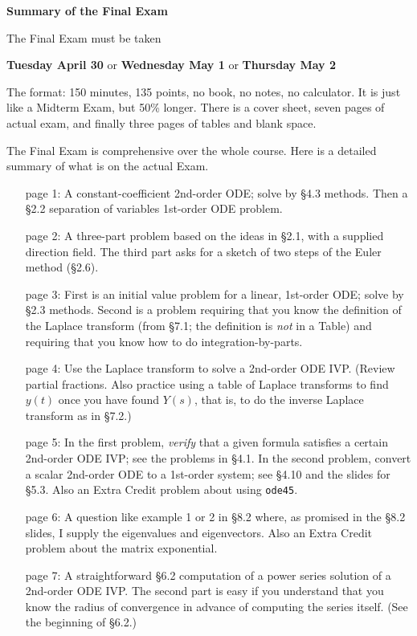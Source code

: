 \documentclass[12pt]{article}
\begin{document}
\phantom{k}
\vspace{2mm}
\Large\centerline{\textbf{Summary of the Final Exam}} \normalsize

\bigskip
The Final Exam must be taken

\medskip
\centerline{\textbf{Tuesday April 30} \quad or \quad \textbf{Wednesday May 1} \quad or \quad \textbf{Thursday May 2}}

The format: 150 minutes, 135 points, no book, no notes, no calculator.  It is just like a Midterm Exam, but 50\% longer.  There is a cover sheet, seven pages of actual exam, and finally three pages of tables and blank space. 

The Final Exam is comprehensive over the whole course.  Here is a detailed summary of what is on the actual Exam.

\medskip
\begin{itemize}
\item[page 1:]  A constant-coefficient 2nd-order ODE; solve by \S4.3 methods.  Then a \S2.2 separation of variables 1st-order ODE problem.
\item[page 2:]  A three-part problem based on the ideas in \S2.1, with a supplied  direction field.  The third part asks for a sketch of two steps of the Euler method (\S2.6).
\item[page 3:]  First is an initial value problem for a linear, 1st-order ODE; solve by \S2.3 methods.  Second is a problem requiring that you know the definition of the Laplace transform (from \S7.1; the definition is \emph{not} in a Table) and requiring that you know how to do integration-by-parts.
\item[page 4:]  Use the Laplace transform to solve a 2nd-order ODE IVP.  (Review partial fractions.  Also practice using a table of Laplace transforms to find $y(t)$ once you have found $Y(s)$, that is, to do the inverse Laplace transform as in \S7.2.)
\item[page 5:]  In the first problem, \emph{verify} that a given formula satisfies a certain 2nd-order ODE IVP; see the problems in \S4.1.  In the second problem, convert a scalar 2nd-order ODE to a 1st-order system; see \S4.10 and the slides for \S5.3.  Also an Extra Credit problem about using \texttt{ode45}.
\item[page 6:]  A question like example 1 or 2 in \S8.2 where, as promised in the \S8.2 slides, I supply the eigenvalues and eigenvectors.  Also an Extra Credit problem about the matrix exponential.
\item[page 7:]  A straightforward \S6.2 computation of a power series solution of a 2nd-order ODE IVP.  The second part is easy if you understand that you know the radius of convergence in advance of computing the series itself.  (See the beginning of \S6.2.)

\end{itemize}
\end{document}
